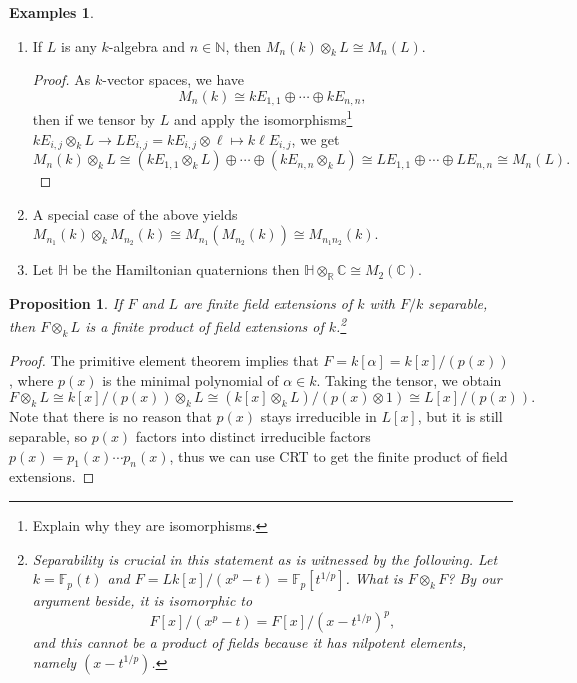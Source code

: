 \documentclass{tufte-handout} %
\newtheorem{prop}[thm]{Proposition}
\theoremstyle{definition}
\newtheorem{exmps}[thm]{Examples}
\theoremstyle{remark}
\newcommand{\R}{\mathbb{R}}
\newcommand{\N}{\mathbb{N}}
\renewcommand{\C}{\mathbb{C}}
\newcommand{\F}{\mathbb{F}}
\newcommand{\bH}{\mathbb{H}}
\begin{document}
\begin{exmps}
	\begin{enumerate}
		\item If $L$ is any $k$-algebra and $n \in \N$, then $M_n(k) \otimes_k L \cong M_n(L)$. 
		
		\begin{proof}
			As $k$-vector spaces, we have 
			\[M_n(k) \cong kE_{1,1} \oplus \cdots \oplus kE_{n,n},\]
			then if we tensor by $L$ and apply the isomorphisms\footnote{Explain why they are isomorphisms.} $kE_{i,j} \otimes_k L \rightarrow LE_{i,j} = kE_{i,j} \otimes \ell \mapsto k\ell E_{i,j}$, we get
			\[M_n(k) \otimes_k L \cong (kE_{1,1} \otimes_k L) \oplus \cdots \oplus (kE_{n,n}\otimes_k L) \cong LE_{1,1} \oplus \cdots \oplus LE_{n,n} \cong M_n(L).\]
			
		\end{proof}
		\item A special case of the above yields $M_{n_1}(k) \otimes_k M_{n_2}(k) \cong M_{n_1}(M_{n_2}(k)) \cong M_{n_1n_2}(k)$.
		\item Let $\bH$ be the Hamiltonian quaternions then $\bH \otimes_{\R} \C \cong M_2(\C)$. %
	\end{enumerate}
\end{exmps}

\begin{prop}\label{finprodext}
	If $F$ and $L$ are finite field extensions of $k$ with $F/k$ separable, then $F \otimes_k L$ is a finite product of field extensions of $k$.\footnote{Separability is crucial in this statement as is witnessed by the following. Let $k = \F_p(t)$ and $F = L k[x]/(x^p-t) = \F_p[t^{1/p}]$. What is $F \otimes_k F$? By our argument beside, it is isomorphic to \[F[x]/(x^p-t) = F[x]/(x-t^{1/p})^p,\] and this cannot be a product of fields because it has nilpotent elements, namely $(x-t^{1/p})$.}
\end{prop}
\begin{proof}
	The primitive element theorem implies that $F = k[\alpha] = k[x]/(p(x))$, where $p(x)$ is the minimal polynomial of $\alpha \in k$. Taking the tensor, we obtain
	\[F \otimes_k L \cong k[x]/(p(x)) \otimes_k L \cong (k[x] \otimes_k L)/(p(x) \otimes 1) \cong L[x]/(p(x)).\]
	Note that there is no reason that $p(x)$ stays irreducible in $L[x]$, but it is still separable, so $p(x)$ factors into distinct irreducible factors $p(x) = p_1(x) \cdots p_n(x)$, thus we can use CRT to get the finite product of field extensions.
\end{proof}
\end{document}
